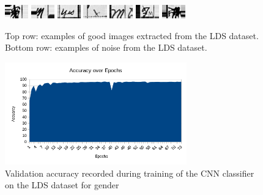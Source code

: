 \begin{figure}[ht]
\begin{center}
    \\[1em]
      \includegraphics[width=0.09\textwidth]{images/Subimages/problematic/004531795_00275-72.png}
      \includegraphics[width=0.09\textwidth]{images/Subimages/problematic/004531795_00275-86.png}
      \includegraphics[width=0.09\textwidth]{images/Subimages/problematic/004531795_00276-2.png}
      \includegraphics[width=0.09\textwidth]{images/Subimages/problematic/004531795_00276-49.png}
      \includegraphics[width=0.09\textwidth]{images/Subimages/problematic/004531795_00605-8.png}
      \includegraphics[width=0.09\textwidth]{images/Subimages/problematic/004531795_00778-55.png}
      \includegraphics[width=0.09\textwidth]{images/Subimages/problematic/004531871_00823-56.png}
  \end{center}
  \caption{
    Top row: examples of good images extracted from the LDS dataset.
    Bottom row: examples of noise from the LDS dataset.
    }
  \label{fig:goodAndBad}
\end{figure}

\begin{figure}[ht]
  \centering
  \includegraphics[width=0.7\textwidth]{images/AccuracyoverEpochslog7.png}
  \caption{
    Validation accuracy recorded during training of the CNN classifier on the
    LDS dataset for gender
    }
  \label{fig:valAccuracyDuringTraining}
\end{figure}




